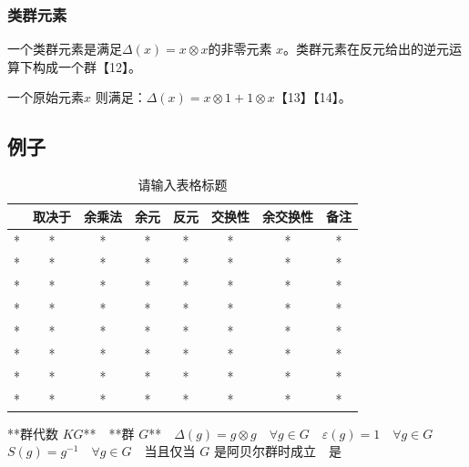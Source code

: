 \subsubsection{类群元素}
一个类群元素是满足$\Delta(x) = x \otimes x$的非零元素 $x$。类群元素在反元给出的逆元运算下构成一个群【12】。

一个原始元素$x$ 则满足：$\Delta(x) = x \otimes 1 + 1 \otimes x$【13】【14】。 
\subsection{例子}
\begin{table}[ht]
\centering
\caption{请输入表格标题}\label{tab_HPFds1}
\begin{tabular}{|c|c|c|c|c|c|c|c|}
\hline
 & \textbf{取决于} & \textbf{余乘法} & \textbf{余元} & \textbf{反元} & \textbf{交换性} & \textbf{余交换性} & \textbf{备注} \\
\hline
* & * & * & * & * & * & * & * \\
\hline
* & * & * & * & * & * & * & * \\
\hline
* & * & * & * & * & * & * & * \\
\hline
* & * & * & * & * & * & * & * \\
\hline
* & * & * & * & * & * & * & * \\
\hline
* & * & * & * & * & * & * & * \\
\hline
* & * & * & * & * & * & * & * \\
\hline
* & * & * & * & * & * & * & * \\
\hline
\end{tabular}
\end{table}

**群代数 $KG$** **群 $G$** $\Delta(g) = g \otimes g \quad \forall g \in G$ $\varepsilon(g) = 1 \quad \forall g \in G$ $S(g) = g^{-1} \quad \forall g \in G$ 当且仅当 $G$ 是阿贝尔群时成立 是
